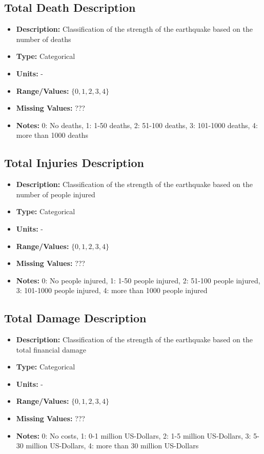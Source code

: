 \documentclass{article}
\begin{document}
\subsection{Total Death Description}
\begin{itemize}
    \item \textbf{Description:} Classification of the strength of the earthquake based on the number of deaths
    \item \textbf{Type:} Categorical
    \item \textbf{Units:} -
    \item \textbf{Range/Values:} $\{0,1,2,3,4 \}$
    \item \textbf{Missing Values:} ???
    \item \textbf{Notes:} 0: No deaths, 1: 1-50 deaths, 2: 51-100 deaths, 3: 101-1000 deaths, 4: more than 1000 deaths
\end{itemize}

\subsection{Total Injuries Description}
\begin{itemize}
    \item \textbf{Description:} Classification of the strength of the earthquake based on the number of people injured
    \item \textbf{Type:} Categorical
    \item \textbf{Units:} -
    \item \textbf{Range/Values:} $\{0,1,2,3,4 \}$
    \item \textbf{Missing Values:} ???
    \item \textbf{Notes:} 0: No people injured, 1: 1-50 people injured, 2: 51-100 people injured, 3: 101-1000 people injured, 4: more than 1000 people injured
\end{itemize}

\subsection{Total Damage Description}
\begin{itemize}
    \item \textbf{Description:} Classification of the strength of the earthquake based on the total financial damage
    \item \textbf{Type:} Categorical
    \item \textbf{Units:} -
    \item \textbf{Range/Values:} $\{0,1,2,3,4 \}$
    \item \textbf{Missing Values:} ???
    \item \textbf{Notes:} 0: No costs, 1: 0-1 million US-Dollars, 2: 1-5 million US-Dollars, 3: 5-30 million US-Dollars, 4: more than 30 million US-Dollars
\end{itemize}
\end{document}
